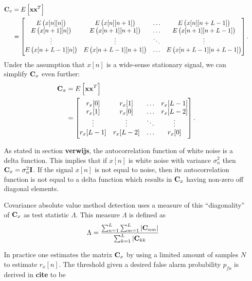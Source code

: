 \documentclass[a4paper, openany, oneside]{memoir}
\begin{document}
\begin{align*}
\boldsymbol{\mathbf{C}}_x &= E\left[\boldsymbol{\mathbf{x}}\boldsymbol{\mathbf{x}}^T\right] \\
&= \begin{bmatrix} 
E\left(x[n][n]\right) & E\left(x[n][n+1]\right) & \ldots & E\left(x[n][n+L-1]\right) \\
E\left(x[n+1][n]\right) & E\left(x[n+1][n+1]\right) & \ldots & E\left(x[n+1][n+L-1]\right) \\
\vdots & \vdots & \ddots & \vdots \\
E\left(x[n+L-1][n]\right) & E\left(x[n+L-1][n+1]\right) & \ldots & E\left(x[n+L-1][n+L-1]\right) \\
\end{bmatrix}.
\end{align*}
Under the assumption that $x[n]$ is a wide-sense stationary signal, we can simplify $\boldsymbol{\mathbf{C}}_x$ even further:
\begin{align*}
\boldsymbol{\mathbf{C}}_x &= E\left[\boldsymbol{\mathbf{x}}\boldsymbol{\mathbf{x}}^T\right] \\
&= \begin{bmatrix} 
r_x[0] & r_x[1] & \ldots & r_x[L-1] \\
r_x[1] & r_x[0] & \ldots & r_x[L-2] \\
\vdots & \vdots & \ddots & \vdots \\
r_x[L-1] & r_x[L-2] & \ldots & r_x[0] \\
\end{bmatrix}.
\end{align*}

As stated in section \textbf{verwijs}, the autocorrelation function of white noise is a delta function. This implies that if $x[n]$ is white noise with variance $\sigma_n^2$ then $\boldsymbol{\mathbf{C}}_x = \sigma_n^2\boldsymbol{\mathbf{I}}$.
If the signal $x[n]$ is not equal to noise, then its autocorrelation function is not equal to a delta function which results in $\boldsymbol{\mathbf{C}}_x$ having non-zero off diagonal elements.

Covariance absolute value method detection uses a measure of this ``diagonality'' of $\boldsymbol{\mathbf{C}}_x$ as test statistic $\Lambda$.
This measure $\Lambda$ is defined as
\begin{align*}
\Lambda &= \frac{\sum_{n=1}^{L} \sum_{m=1}^L \left|\boldsymbol{\mathbf{C}}_{nm}\right|}{\sum_{k=1}^L |\boldsymbol{\mathbf{C}}_{kk}}
\end{align*} 

In practice one estimates the matrix $\boldsymbol{\mathbf{C}}_x$ by using a limited amount of samples $N$ to estimate $r_x[n]$. The threshold given a desired false alarm probability
$p_{fa}$ is derived in \textbf{cite} to be
\end{document}
